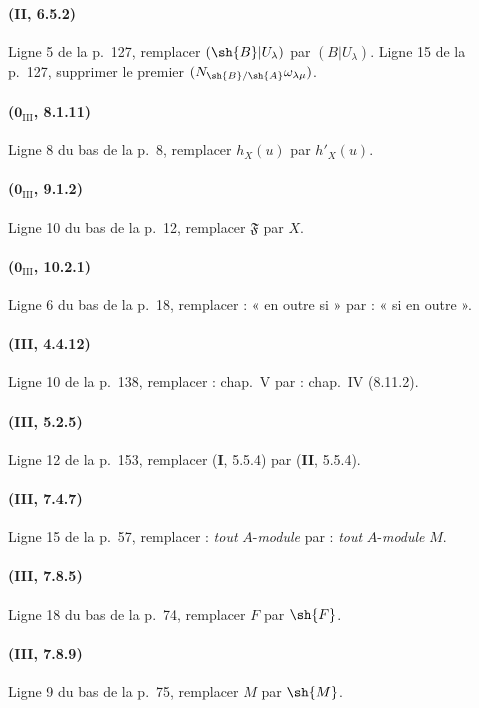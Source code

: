 \paragraph{(II, 6.5.2)}
Ligne 5 de la p.~127, remplacer $(\sh{B}|U_\lambda)$ par
$(B|U_\lambda)$. Ligne 15 de la p.~127, supprimer le premier
$(N_{\sh{B}/\sh{A}}\omega_{\lambda\mu})$.

\paragraph{($\mathbf{0}_{\mathrm{III}}$, 8.1.11)}
Ligne 8 du bas de la p.~8, remplacer $h_X(u)$ par $h'_X(u)$.

\paragraph{($\mathbf{0}_{\mathrm{III}}$, 9.1.2)}
Ligne 10 du bas de la p.~12, remplacer $\mathfrak{F}$ par $X$.

\paragraph{($\mathbf{0}_{\mathrm{III}}$, 10.2.1)}
Ligne 6 du bas de la p.~18, remplacer : « en outre si » par : « si en
outre ».

\paragraph{(III, 4.4.12)}
Ligne 10 de la p.~138, remplacer : chap.~V par : chap.~IV (8.11.2).

\paragraph{(III, 5.2.5)}
Ligne 12 de la p.~153, remplacer (\textbf{I}, 5.5.4) par (\textbf{II}, 5.5.4).

\paragraph{(III, 7.4.7)}
Ligne 15 de la p.~57, remplacer : \emph{tout} $A$-\emph{module} par : \emph{tout}
$A$-\emph{module} $M$.

\paragraph{(III, 7.8.5)}
Ligne 18 du bas de la p.~74, remplacer $F$ par $\sh{F}$.

\paragraph{(III, 7.8.9)}
Ligne 9 du bas de la p.~75, remplacer $M$ par $\sh{M}$.

